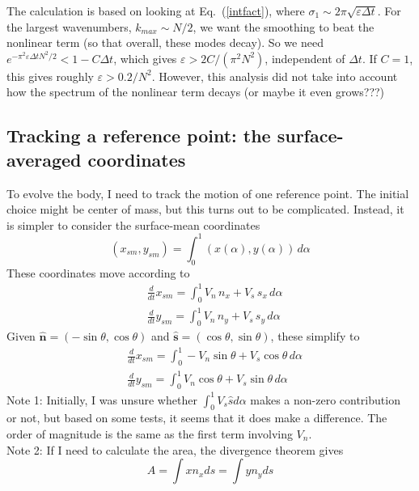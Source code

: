 \documentclass[11pt]{article}
\newcommand{\td}[2] { \frac{d #1} { d #2 } }
\newcommand{\bvec}[1]{\ensuremath{\boldsymbol{#1}}}
\newcommand{\nhat}{\hat{\bvec{n}}}
\newcommand{\shat}{\hat{\bvec{s}}}
\newcommand{\eps}{\varepsilon}
\begin{document}
The calculation is based on looking at Eq.~(\ref{intfact}), where $\sigma_1 \sim 2 \pi \sqrt{\eps \Delta t}$. For the largest wavenumbers, $k_{max} \sim N/2$, we want the smoothing to beat the nonlinear term (so that overall, these modes decay). So we need $e^{-\pi^2 \eps \Delta t N^2 / 2} < 1 - C\Delta t$, which gives $\eps > 2C/(\pi^2 N^2)$, independent of $\Delta t$. If $C=1$, this gives roughly $\eps > 0.2/ N^2$. However, this analysis did not take into account how the spectrum of the nonlinear term decays (or maybe it even grows???)


\subsection{Tracking a reference point: the surface-averaged coordinates}
To evolve the body, I need to track the motion of one reference point. The initial choice might be center of mass, but this turns out to be complicated. Instead, it is simpler to consider the surface-mean coordinates
\begin{equation}
(x_{sm}, y_{sm}) = \int_0^1 (x(\alpha), y(\alpha)) \, d\alpha
\end{equation}
These coordinates move according to
\begin{align}
& \td{}{t} x_{sm} = \int_0^1 V_n \, n_x + V_s \, s_x \, d\alpha \\
& \td{}{t} y_{sm} = \int_0^1 V_n \, n_y + V_s \, s_y \, d\alpha
\end{align}
Given $\nhat = (-\sin \theta, \cos \theta)$ and $\shat = (\cos \theta, \sin \theta)$, these simplify to
\begin{align}
& \td{}{t} x_{sm} = \int_0^1 -V_n \sin \theta + V_s \cos \theta \, d\alpha \\
& \td{}{t} y_{sm} = \int_0^1 V_n \cos \theta + V_s \sin \theta \, d\alpha
\end{align}
Note 1: Initially, I was unsure whether $\int_0^1 V_s \hat{s} d\alpha$ makes a non-zero contribution or not, but based on some tests, it seems that it does make a difference. The order of magnitude is the same as the first term involving $V_n$. \\
Note 2: If I need to calculate the area, the divergence theorem gives
\begin{equation}
A = \int x n_x ds = \int y n_y ds
\end{equation}
\end{document}
